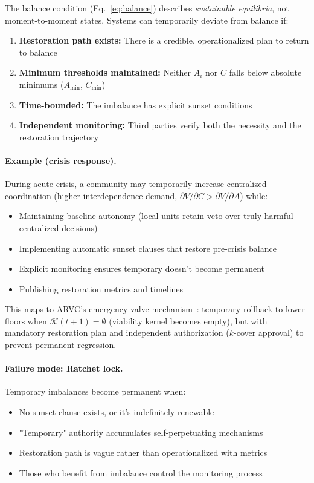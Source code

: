 \documentclass[11pt,a4paper]{article}
\begin{document}
The balance condition (Eq.~\ref{eq:balance}) describes \emph{sustainable equilibria}, not moment-to-moment states. Systems can temporarily deviate from balance if:

\begin{enumerate}
    \item \textbf{Restoration path exists:} There is a credible, operationalized plan to return to balance
    \item \textbf{Minimum thresholds maintained:} Neither $A_i$ nor $C$ falls below absolute minimums ($A_{\min}$, $C_{\min}$)
    \item \textbf{Time-bounded:} The imbalance has explicit sunset conditions
    \item \textbf{Independent monitoring:} Third parties verify both the necessity and the restoration trajectory
\end{enumerate}

\paragraph{Example (crisis response).} During acute crisis, a community may temporarily increase centralized coordination (higher interdependence demand, $\partial V/\partial C > \partial V/\partial A$) while:
\begin{itemize}
    \item Maintaining baseline autonomy (local units retain veto over truly harmful centralized decisions)
    \item Implementing automatic sunset clauses that restore pre-crisis balance
    \item Explicit monitoring ensures temporary doesn't become permanent
    \item Publishing restoration metrics and timelines
\end{itemize}

This maps to ARVC's emergency valve mechanism~\cite{arvc}: temporary rollback to lower floors when $\mathcal{K}(t+1) = \emptyset$ (viability kernel becomes empty), but with mandatory restoration plan and independent authorization ($k$-cover approval) to prevent permanent regression.

\paragraph{Failure mode: Ratchet lock.} Temporary imbalances become permanent when:
\begin{itemize}
    \item No sunset clause exists, or it's indefinitely renewable
    \item "Temporary" authority accumulates self-perpetuating mechanisms
    \item Restoration path is vague rather than operationalized with metrics
    \item Those who benefit from imbalance control the monitoring process
\end{itemize}
\end{document}
